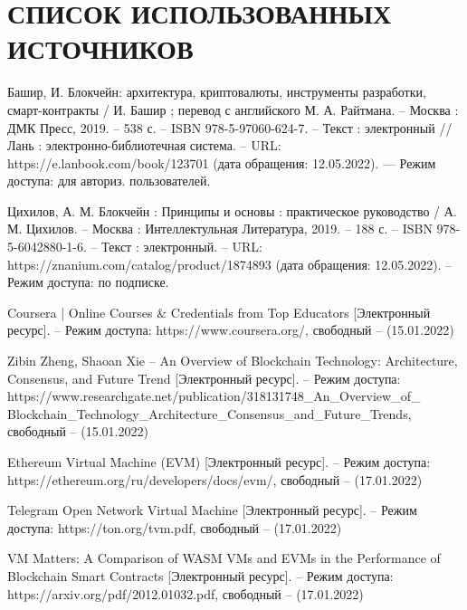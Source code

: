 \section*{СПИСОК ИСПОЛЬЗОВАННЫХ ИСТОЧНИКОВ}

\begingroup
\renewcommand{\section}[2]{}
\begin{thebibliography}{}
	Башир, И. Блокчейн: архитектура, криптовалюты, инструменты разработки, смарт-контракты / И. Башир ; перевод с английского М. А. Райтмана. -- Москва : ДМК Пресс, 2019. -- 538 с. -- ISBN 978-5-97060-624-7. -- Текст : электронный // Лань : электронно-библиотечная система. -- URL: https://e.lanbook.com/book/123701 (дата обращения: 12.05.2022). — Режим доступа: для авториз. пользователей.
	
	Цихилов, А. М. Блокчейн : Принципы и основы : практическое руководство / А. М. Цихилов. -- Москва : Интеллектульная Литература, 2019. -- 188 с. -- ISBN 978-5-6042880-1-6. -- Текст : электронный. -- URL: https://znanium.com/catalog/product/1874893 (дата обращения: 12.05.2022). -- Режим доступа: по подписке. 
	
	Coursera | Online Courses \& Credentials from Top Educators [Электронный ресурс]. -- Режим доступа: https://www.coursera.org/, свободный -- (15.01.2022)
	
	Zibin Zheng, Shaoan Xie -- An Overview of Blockchain Technology: Architecture, Consensus, and Future Trend [Электронный ресурс]. -- Режим доступа: https://www.researchgate.net/publication/318131748\_An\_Overview\_of\_
	Blockchain\_Technology\_Architecture\_Consensus\_and\_Future\_Trends, свободный -- (15.01.2022)
	
	Ethereum Virtual Machine (EVM) [Электронный ресурс]. -- Режим доступа: https://ethereum.org/ru/developers/docs/evm/, свободный -- (17.01.2022)
	
	Telegram Open Network Virtual Machine [Электронный ресурс]. -- Режим доступа: https://ton.org/tvm.pdf, свободный -- (17.01.2022)
	
	VM Matters: A Comparison of WASM VMs and EVMs in the Performance of Blockchain Smart Contracts [Электронный ресурс]. -- Режим доступа: https://arxiv.org/pdf/2012.01032.pdf, свободный -- (17.01.2022)
	

\end{thebibliography}
